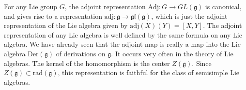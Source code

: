 \begin{example}
    For any Lie group $G$, the adjoint representation $\text{Adj}: G \to GL(\mathfrak{g})$ is canonical, and gives rise to a representation $\text{adj}: \mathfrak{g} \to \mathfrak{gl}(\mathfrak{g})$, which is just the adjoint representation of the Lie algebra given by $\text{adj}(X)(Y) = [X,Y]$. The adjoint representation of any Lie algebra is well defined by the same formula on any Lie algebra. We have already seen that the adjoint map is really a map into the Lie algebra $\text{Der}(\mathfrak{g})$ of derivations on $\mathfrak{g}$. It occurs very often in the theory of Lie algebras. The kernel of the homomorphism is the center $Z(\mathfrak{g})$. Since $Z(\mathfrak{g}) \subset \text{rad}(\mathfrak{g})$, this representation is faithful for the class of semisimple Lie algebras.
\end{example}


